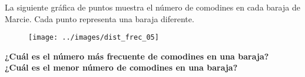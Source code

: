 La siguiente gráfica de puntos muestra el número de comodines en cada baraja de Marcie. Cada punto representa una baraja diferente.
\begin{figure}[H]
    \begin{center}
        \texttt{[image: ../images/dist\_frec\_05]}
    \end{center}
    \caption{}
    \label{fig:dist_frec_05}
\end{figure}
\textbf{¿Cuál es el número más frecuente de comodines en una baraja?}\\
\textbf{¿Cuál es el menor número de comodines en una baraja?}